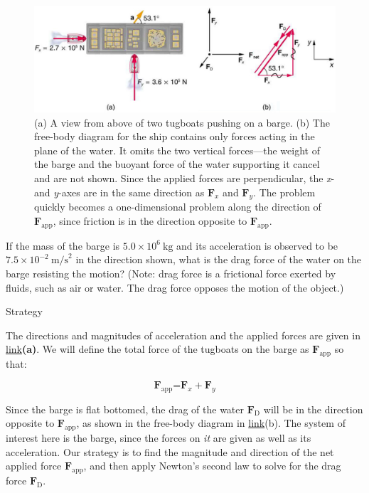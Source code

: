 \documentclass[
]{book}
\begin{document}
\begin{figure}
\hypertarget{import-auto-id1221020}{%
\centering
\includegraphics{images/Figure_04_07_01.jpg}
\caption{(a) A view from above of two tugboats pushing on a barge. (b) The
free-body diagram for the ship contains only forces acting in the plane
of the water. It omits the two vertical forces---the weight of the barge
and the buoyant force of the water supporting it cancel and are not
shown. Since the applied forces are perpendicular, the \emph{x}- and \emph{y}-axes
are in the same direction as \(\textbf{F}_{x}{}\) and \(\textbf{F}_{y}{}\).
The problem quickly becomes a one-dimensional problem along the
direction of \(\textbf{F}_{\text{app}}{}\), since friction is in the
direction opposite to
\(\textbf{F}_{\text{app}}{}\).}\label{import-auto-id1221020}
}
\end{figure}

If the mass of the barge is \({{5.0 \times \text{10}^{6}}\ \text{kg}}{}\)
and its acceleration is observed to be
\({7\text{.}{\text{5} \times \text{10}^{- 2}}\ \text{m/s}^{2}}{}\) in the
direction shown, what is the drag force of the water on the barge
resisting the motion? (Note: drag force is a frictional force exerted by
fluids, such as air or water. The drag force opposes the motion of the
object.)

{Strategy}

The directions and magnitudes of acceleration and the applied forces are
given in \protect\hyperlink{import-auto-id1221020}{link}\textbf{(a)}.
We will define the total force of the tugboats on the barge as
\(\textbf{F}_{\text{app}}{}\) so that:

\leavevmode{}%
\[\textbf{F}_{\text{app}}\text{=}\textbf{F}_{\mathit{x}} + \textbf{F}_{\mathit{y}}\]

Since the barge is flat bottomed, the drag of the water
\(\textbf{F}_{\text{D}}{}\) will be in the direction opposite to
\(\textbf{F}_{\text{app}}{}\), as shown in the free-body diagram in
\protect\hyperlink{import-auto-id1221020}{link}(b). The system of
interest here is the barge, since the forces on
\emph{it} are given as well as its
acceleration. Our strategy is to find the magnitude and direction of the
net applied force \(\textbf{F}_{\text{app}}{}\), and then apply Newton's
second law to solve for the drag force \(\textbf{F}_{\text{D}}{}\).
\end{document}
